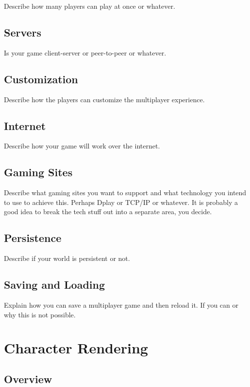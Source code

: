 \documentclass[a4paper]{report}
\begin{document}
		Describe how many players can play at once or whatever.

	\section{Servers}

		Is your game client-server or peer-to-peer or whatever.

	\section{Customization}

		Describe how the players can customize the multiplayer experience.

	\section{Internet}

		Describe how your game will work over the internet.

	\section{Gaming Sites}

		Describe what gaming sites you want to support and what technology you intend to use to achieve this.  Perhaps Dplay or TCP/IP or whatever.  It is probably a good idea to break the tech stuff out into a separate area, you decide.

	\section{Persistence}

		Describe if your world is persistent or not.

	\section{Saving and Loading}

		Explain how you can save a multiplayer game and then reload it.  If you can or why this is not possible.

\chapter{Character Rendering}

	\section{Overview}
\end{document}
